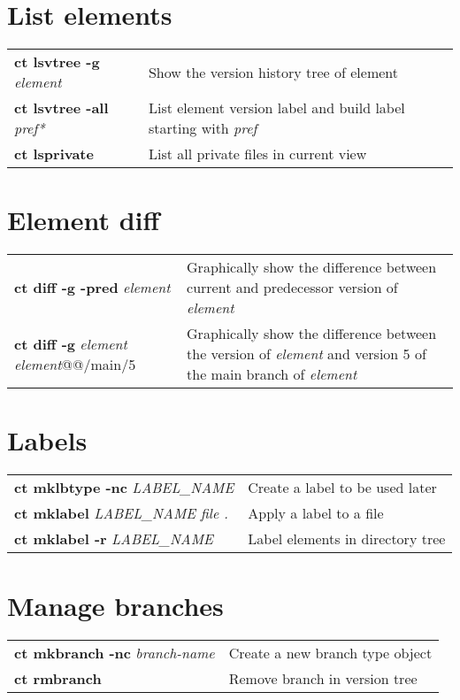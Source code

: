 \documentclass[10pt,twocolumn]{article}
\begin{document}
\section*{List elements}
\begin{tabularx}{10.2cm}{l|X}
  \textbf{ct lsvtree -g} \textit{element}    & Show the version history tree of element \\
  \textbf{ct lsvtree -all} \textit{pref*} & List element version label and build label starting with \textit{pref}\\
  \textbf{ct lsprivate}                   & List all private files in current view \\
\end{tabularx}

\section*{Element diff}
\begin{tabularx}{10.2cm}{>{\hsize=4.6cm}X|>{\hsize=4.7cm}X}
  \textbf{ct diff -g -pred} \textit{element}            & Graphically show the difference between current and predecessor version of \textit{element} \\ 
  \textbf{ct diff -g} \textit{element element}@@/main/5 & Graphically show the difference between the version of \textit{element} and version 5 of the main branch of \textit{element} \\
\end{tabularx}

\section*{Labels}
\begin{tabularx}{10.2cm}{l|X}
  \textbf{ct mklbtype -nc} \textit{LABEL\_NAME} & Create a label to be used later \\
 \textbf{ct mklabel} \textit{LABEL\_NAME file .} & Apply a label to a file \\
 \textbf{ct mklabel -r} \textit{LABEL\_NAME} & Label elements in directory tree \\ 
\end{tabularx}

\section*{Manage branches}
\begin{tabularx}{10.2cm}{l|X}
 \textbf{ct mkbranch -nc} \textit{branch-name} & Create a new branch type object  \\ 
 \textbf{ct rmbranch} & Remove branch in version tree \\
\end{tabularx}
\end{document}
